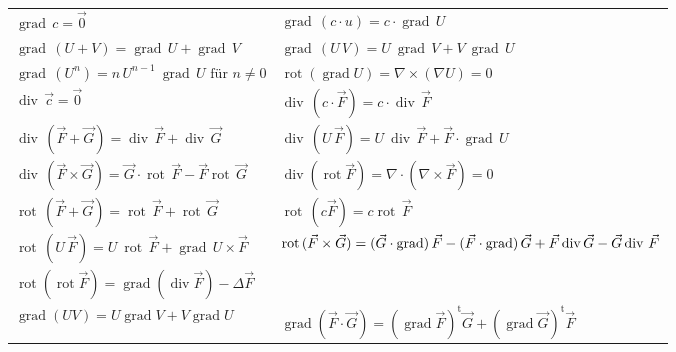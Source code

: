 {	
\renewcommand{\arraystretch}{1.2}					
	\begin{tabularx}{\textwidth}{|X|X|}
		\hline
		$\operatorname{grad}\,c=\vec{0}$ & $\operatorname{grad}\,(c\cdot u)=c\cdot\operatorname{grad}\,U$    \\

		$\operatorname{grad}\,(U+V)=\operatorname{grad}\,U+\operatorname{grad}\,V$ &
		$\operatorname{grad}\,(U\,V) = U\ \operatorname{grad}\,V + V\ \operatorname{grad}\,U$\\

		$\label{eqn:ProduktregelEinesGradientMitPotenzen}
		\operatorname{grad}\,(U^n) = n\, U^{n-1}\ \operatorname{grad}\,U \text{ für } n\neq 0$&
		$\operatorname{rot}(\operatorname{grad}U)=\nabla \times (\nabla U) = 0$ \\
		\hline\hline
		$\operatorname{div}\,\vec{c}=\vec{0}$&
		$\operatorname{div}\,(c\cdot \vec{F})=c\cdot\operatorname{div}\,\vec{F}$ \\
		
		$\operatorname{div}\,(\vec{F}+\vec{G})=\operatorname{div}\,\vec{F}+\operatorname{div}\,\vec{G}$ &
		$\operatorname{div}\,(U\,\vec{F}) = U\ \operatorname{div}\,\vec{F} + \vec{F}\cdot \operatorname{grad}\,U$\\		

		$\operatorname{div}\,(\vec{F} \times\vec{G})=\vec{G}\cdot \operatorname{rot}\,\vec{F} - \vec{F}\operatorname{rot}\,\vec{G}$ &
		$\operatorname{div}(\operatorname{rot}\vec{F}) = \nabla \cdot (\nabla \times\vec F) = 0$\\
		\hline\hline
		
		$\operatorname{rot}\,(\vec{F}+\vec{G})=\operatorname{rot}\,\vec{F}+\operatorname{rot}\,\vec{G}$ &
		$\operatorname{rot}\,(c \vec{F})=c\operatorname{rot}\,\vec{F}$ \\

		$\operatorname{rot}\,(U\,\vec{F}) = U\ \operatorname{rot}\,\vec{F} + \operatorname{grad}\,U \times \vec{F}$&
		$\operatorname{rot}\,(\vec{F} \times\vec{G}) =\newline (\vec{G}\cdot \operatorname{grad})\,\vec{F} - (\vec{F}\cdot \operatorname{grad})\,\vec{G} + \vec{F}\operatorname{div}\vec{G} - \vec{G}\operatorname{div}\,\vec{F}$
		\\
		\hline\hline
		$	\operatorname{rot}(\operatorname{rot}\vec{F}) = \operatorname{grad}(\operatorname{div}\vec{F}) -\Delta \vec{F}$&\\

		$\operatorname{grad}(UV)=U\operatorname{grad}V+V\operatorname{grad}U $ &
		$\operatorname{grad}(\vec{F}\cdot \vec{G}) = (\operatorname{grad}\vec{F})^{\operatorname t}\vec{G} + (\operatorname{grad}\vec{G})^{\operatorname t}\vec{F} $ \\


\end{tabularx}}
